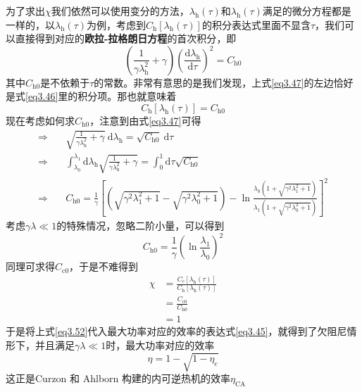 为了求出$\chi$我们依然可以使用变分的方法，$\lambda_{\mathrm{h}}(\tau)$和$\lambda_{\mathrm{h}}(\tau)$满足的微分方程都是一样的，以$\lambda_{\mathrm{h}}(\tau)$为例，考虑到$C_{\mathrm{h}} [\lambda_{\mathrm{h}}(\tau)]$的积分表达式里面不显含$\tau$，我们可以直接得到对应的\textbf{欧拉-拉格朗日方程}的首次积分\cite{Wu2003}，即
\begin{equation}
    \left(\frac{1}{\gamma \lambda_{\mathrm{h}}^{2}}+\gamma\right)\left(\frac{\mathrm{d} \lambda_{\mathrm{h}}}{\mathrm{d} \tau}\right)^{2}=C_{\mathrm{h0}}
    \label{eq3.47}
\end{equation}
其中$C_{\mathrm{h0}}$是不依赖于$\tau$的常数。非常有意思的是我们发现，上式\eqref{eq3.47}的左边恰好是式\eqref{eq3.46}里的积分项。那也就意味着
\begin{equation}
    C_{\mathrm{h}} [\lambda_{\mathrm{h}}(\tau)]=C_{\mathrm{h0}}
    \label{eq3.49}
\end{equation}
现在考虑如何求$C_{\mathrm{h0}}$，注意到由式\eqref{eq3.47}可得
\begin{align}
    \Rightarrow \quad &\sqrt{\frac{1}{\gamma \lambda_{\mathrm{h}}^2}+\gamma} \ \mathrm{d} \lambda_{\mathrm{h}}=\sqrt{C_{\mathrm{h0}}} \ \mathrm{d} \tau\\
    \Rightarrow \quad& \int_{\lambda_0}^{\lambda_1} \mathrm{d}  \lambda_{\mathrm{h}} \sqrt{\frac{1}{\gamma \lambda_{\mathrm{h}}^2}+\gamma}=\int_{0}^{1} \mathrm{d} \tau \sqrt{C_{\mathrm{h0}}}\\
    \Rightarrow \quad& C_{\mathrm{h0}} =\frac{1}{\gamma} \left[\left(\sqrt{\gamma^{2} \lambda_{1} ^{2}+1}-\sqrt{\gamma^{2} \lambda_{0} ^{2}+1}\right)-\ln \frac{\lambda_{0}\left(1+\sqrt{\gamma^{2} \lambda_{1} ^{2}+1}\right) }{\lambda_{1} \left(1+\sqrt{\gamma^{2} \lambda_{0} ^{2}+1}\right)}\right]^2 
    \label{eq3.50}
\end{align}
考虑$\gamma \lambda \ll 1$的特殊情况，忽略二阶小量，可以得到
\begin{equation}
    C_{\mathrm{h0}}=\frac{1}{\gamma}\left(\ln \frac{\lambda_{1}}{\lambda_{0}}\right)^2
    \label{eq3.51}
\end{equation}
同理可求得$C_{\mathrm{c0}}$，于是不难得到
\begin{equation}
    \begin{split}
        \chi&=\frac{C_{\mathrm{c}} [\lambda_{\mathrm{h}}(\tau)]}{C_{\mathrm{h}} [\lambda_{\mathrm{h}}(\tau)]}\\
        &=\frac{C_{\mathrm{c0}}}{C_{\mathrm{h0}}}\\
        &=1
    \end{split}
    \label{eq3.52}
\end{equation}
于是将上式\eqref{eq3.52}代入最大功率对应的效率的表达式\eqref{eq3.45}，就得到了欠阻尼情形下，并且满足$\gamma \lambda \ll 1$时，最大功率对应的效率
\begin{equation}
    \eta=1-\sqrt{1-\eta_{\mathrm{c}}}
    \label{eq3.53}
\end{equation}
这正是Curzon 和 Ahlborn 构建的内可逆热机\cite{Curzon1975}的效率$\eta_{\mathrm{CA}}$

